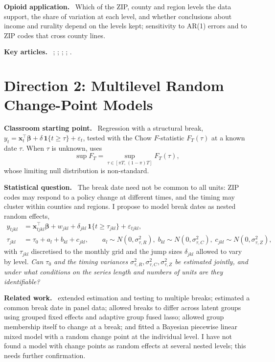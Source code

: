 \documentclass[10pt]{article}
\newcommand{\para}[1]{\textbf{#1}\ }
\newcommand{\ind}{\mathbf{1}}
\begin{document}
\para{Opioid application.} Which of the ZIP, county and region levels the data support, the share of variation at each level, and whether conclusions about income and rurality depend on the levels kept; sensitivity to AR(1) errors and to ZIP codes that cross county lines.

\para{Key articles.} \citet{jones2011}; \citet{delattre2014}; \citet{greven2010}; \citet{lorah2019}; \citet{cho2024}.

\clearpage
\section{Direction 2: Multilevel Random Change-Point Models}

\para{Classroom starting point.} Regression with a structural break, $y_t = \bm{x}_t^{\top}\bm\beta + \delta\,\ind\{t \ge \tau\} + \varepsilon_t$, tested with the Chow $F$-statistic $F_T(\tau)$ at a known date $\tau$. When $\tau$ is unknown, \citet{andrews1993} uses
\begin{equation}\label{eq:supf}
  \sup F_T = \sup_{\tau \in [\pi T,\,(1-\pi)T]} F_T(\tau),
\end{equation}
whose limiting null distribution is non-standard.

\para{Statistical question.} The break date need not be common to all units: ZIP codes may respond to a policy change at different times, and the timing may cluster within counties and regions. I propose to model break dates as nested random effects,
\begin{align}
  y_{tjkl} &= \bm{x}_{tjkl}^{\top}\bm\beta + w_{jkl} + \delta_{jkl}\,\ind\{t \ge \tau_{jkl}\} + \varepsilon_{tjkl}, \label{eq:cp}\\
  \tau_{jkl} &= \tau_0 + a_l + b_{kl} + c_{jkl}, \qquad a_l \sim N(0,\sigma^2_{\tau,R}),\; b_{kl} \sim N(0,\sigma^2_{\tau,C}),\; c_{jkl} \sim N(0,\sigma^2_{\tau,Z}), \label{eq:tau}
\end{align}
with $\tau_{jkl}$ discretised to the monthly grid and the jump sizes $\delta_{jkl}$ allowed to vary by level. \emph{Can $\tau_0$ and the timing variances $\sigma^2_{\tau,R}, \sigma^2_{\tau,C}, \sigma^2_{\tau,Z}$ be estimated jointly, and under what conditions on the series length and numbers of units are they identifiable?}

\para{Related work.} \citet{baiperron1998} extended estimation and testing to multiple breaks; \citet{bai2010} estimated a common break date in panel data; \citet{okui2021} allowed breaks to differ across latent groups using grouped fixed effects and adaptive group fused lasso; \citet{lumsdaine2023} allowed group membership itself to change at a break; and \citet{brilleman2017} fitted a Bayesian piecewise linear mixed model with a random change point at the individual level. I have not found a model with change points as random effects at several nested levels; this needs further confirmation.
\end{document}
